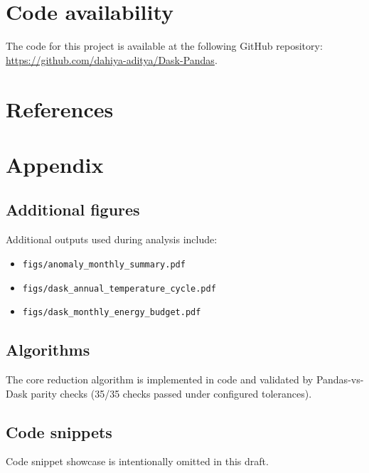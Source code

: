\section{Code availability}
The code for this project is available at the following GitHub repository:
\url{https://github.com/dahiya-aditya/Dask-Pandas}.

\section{References}



\section{Appendix}

\subsection{Additional figures}
Additional outputs used during analysis include:
\begin{itemize}
    \item \verb|figs/anomaly_monthly_summary.pdf|
    \item \verb|figs/dask_annual_temperature_cycle.pdf|
    \item \verb|figs/dask_monthly_energy_budget.pdf|
\end{itemize}

\subsection{Algorithms}
The core reduction algorithm is implemented in code and validated by
Pandas-vs-Dask parity checks (35/35 checks passed under configured tolerances).


\subsection{Code snippets}
Code snippet showcase is intentionally omitted in this draft.



